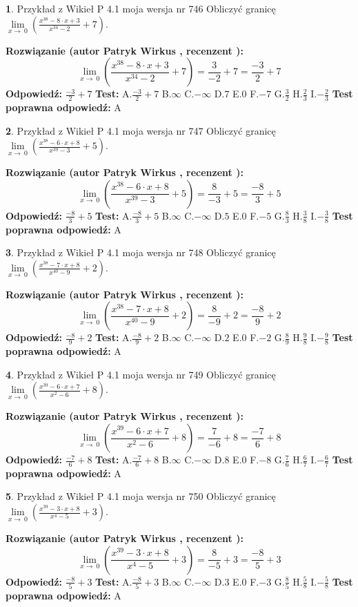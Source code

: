 \documentclass[12pt, a4paper]{article}
\theoremstyle{definition} %
\newtheorem{zad}{}
\newcommand{\zadStart}[1]{\begin{zad}#1\newline}
\newcommand{\zadStop}{\end{zad}}
\newcommand{\rozwStart}[2]{\noindent \textbf{Rozwiązanie (autor #1 , recenzent #2): }\newline}
\newcommand{\rozwStop}{\newline}
\newcommand{\odpStart}{\noindent \textbf{Odpowiedź:}\newline}
\newcommand{\odpStop}{\newline}
\newcommand{\testStart}{\noindent \textbf{Test:}\newline}
\newcommand{\testStop}{\newline}
\newcommand{\kluczStart}{\noindent \textbf{Test poprawna odpowiedź:}\newline}
\newcommand{\kluczStop}{\newline}
\begin{document}
\zadStart{Przykład z Wikieł P 4.1 moja wersja nr 746}
Obliczyć granicę $\lim\limits_{x\to\ 0}(\frac{x^{38}-8 \cdot x +3}{x^{34}-2}+7)$.
\zadStop
\rozwStart{Patryk Wirkus}{}
$$\lim\limits_{x\to\ 0}(\frac{x^{38}-8 \cdot x +3}{x^{34}-2}+7)=\frac{3}{-2}+7=\frac{-3}{2}+7$$
\rozwStop
\odpStart
$\frac{-3}{2}+7$
\odpStop
\testStart
A.$\frac{-3}{2}+7$
B.$\infty$
C.$-\infty$
D.$7$
E.$0$
F.$-7$
G.$\frac{3}{2}$
H.$\frac{2}{3}$
I.$-\frac{2}{3}$
\testStop
\kluczStart
A
\kluczStop



\zadStart{Przykład z Wikieł P 4.1 moja wersja nr 747}
Obliczyć granicę $\lim\limits_{x\to\ 0}(\frac{x^{38}-6 \cdot x +8}{x^{39}-3}+5)$.
\zadStop
\rozwStart{Patryk Wirkus}{}
$$\lim\limits_{x\to\ 0}(\frac{x^{38}-6 \cdot x +8}{x^{39}-3}+5)=\frac{8}{-3}+5=\frac{-8}{3}+5$$
\rozwStop
\odpStart
$\frac{-8}{3}+5$
\odpStop
\testStart
A.$\frac{-8}{3}+5$
B.$\infty$
C.$-\infty$
D.$5$
E.$0$
F.$-5$
G.$\frac{8}{3}$
H.$\frac{3}{8}$
I.$-\frac{3}{8}$
\testStop
\kluczStart
A
\kluczStop



\zadStart{Przykład z Wikieł P 4.1 moja wersja nr 748}
Obliczyć granicę $\lim\limits_{x\to\ 0}(\frac{x^{38}-7 \cdot x +8}{x^{40}-9}+2)$.
\zadStop
\rozwStart{Patryk Wirkus}{}
$$\lim\limits_{x\to\ 0}(\frac{x^{38}-7 \cdot x +8}{x^{40}-9}+2)=\frac{8}{-9}+2=\frac{-8}{9}+2$$
\rozwStop
\odpStart
$\frac{-8}{9}+2$
\odpStop
\testStart
A.$\frac{-8}{9}+2$
B.$\infty$
C.$-\infty$
D.$2$
E.$0$
F.$-2$
G.$\frac{8}{9}$
H.$\frac{9}{8}$
I.$-\frac{9}{8}$
\testStop
\kluczStart
A
\kluczStop



\zadStart{Przykład z Wikieł P 4.1 moja wersja nr 749}
Obliczyć granicę $\lim\limits_{x\to\ 0}(\frac{x^{39}-6 \cdot x +7}{x^{2}-6}+8)$.
\zadStop
\rozwStart{Patryk Wirkus}{}
$$\lim\limits_{x\to\ 0}(\frac{x^{39}-6 \cdot x +7}{x^{2}-6}+8)=\frac{7}{-6}+8=\frac{-7}{6}+8$$
\rozwStop
\odpStart
$\frac{-7}{6}+8$
\odpStop
\testStart
A.$\frac{-7}{6}+8$
B.$\infty$
C.$-\infty$
D.$8$
E.$0$
F.$-8$
G.$\frac{7}{6}$
H.$\frac{6}{7}$
I.$-\frac{6}{7}$
\testStop
\kluczStart
A
\kluczStop



\zadStart{Przykład z Wikieł P 4.1 moja wersja nr 750}
Obliczyć granicę $\lim\limits_{x\to\ 0}(\frac{x^{39}-3 \cdot x +8}{x^{4}-5}+3)$.
\zadStop
\rozwStart{Patryk Wirkus}{}
$$\lim\limits_{x\to\ 0}(\frac{x^{39}-3 \cdot x +8}{x^{4}-5}+3)=\frac{8}{-5}+3=\frac{-8}{5}+3$$
\rozwStop
\odpStart
$\frac{-8}{5}+3$
\odpStop
\testStart
A.$\frac{-8}{5}+3$
B.$\infty$
C.$-\infty$
D.$3$
E.$0$
F.$-3$
G.$\frac{8}{5}$
H.$\frac{5}{8}$
I.$-\frac{5}{8}$
\testStop
\kluczStart
A
\kluczStop
\end{document}
